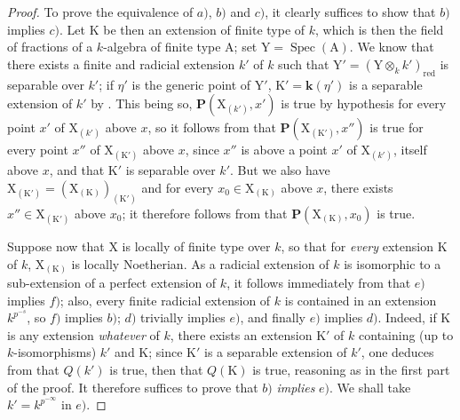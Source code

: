 \begin{proof}
To prove the equivalence of $a)$, $b)$ and $c)$, it clearly suffices to show that $b)$ implies $c)$. Let $\mathrm{K}$ be then an extension of finite type of $k$, which is then the field of fractions of a $k$-algebra of finite type $\mathrm{A}$; set $\mathrm{Y}=\operatorname{Spec}(\mathrm{A})$. We know  that there exists a finite and radicial extension $k'$ of $k$ such that $\mathrm{Y}'=(\mathrm{Y}\otimes_k k')_{\mathrm{red}}$ is separable over $k'$; if $\eta'$ is the generic point of $\mathrm{Y}'$, $\mathrm{K}'=\boldsymbol{k}(\eta')$ is a separable extension of $k'$ by . This being so, $\boldsymbol{P}(\mathrm{X}_{(k')},x')$ is true by hypothesis for every point $x'$ of $\mathrm{X}_{(k')}$ above $x$, so it follows from  that $\boldsymbol{P}(\mathrm{X}_{(\mathrm{K}')},x'')$ is true for every point $x''$ of $\mathrm{X}_{(\mathrm{K}')}$ above $x$, since $x''$ is above a point $x'$ of $\mathrm{X}_{(k')}$, itself above $x$, and that $\mathrm{K}'$ is separable over $k'$. But we also have $\mathrm{X}_{(\mathrm{K}')}=(\mathrm{X}_{(\mathrm{K})})_{(\mathrm{K}')}$ and for every $x_0\in\mathrm{X}_{(\mathrm{K})}$ above $x$, there exists $x''\in\mathrm{X}_{(\mathrm{K}')}$ above $x_0$; it therefore follows from  that $\boldsymbol{P}(\mathrm{X}_{(\mathrm{K})},x_0)$ is true.

Suppose now that $\mathrm{X}$ is locally of finite type over $k$, so that for \emph{every} extension $\mathrm{K}$ of $k$, $\mathrm{X}_{(\mathrm{K})}$ is locally Noetherian. As a radicial extension of $k$ is isomorphic to a sub-extension of a perfect extension of $k$, it follows immediately from  that $e)$ implies $f)$; also, every finite radicial extension of $k$ is contained in an extension $k^{p^{-s}}$, so $f)$ implies $b)$; $d)$ trivially implies $e)$, and finally $e)$ implies $d)$. Indeed, if $\mathrm{K}$ is any extension \emph{whatever} of $k$, there exists an extension $\mathrm{K}'$ of $k$ containing (up to $k$-isomorphisms) $k'$ and $\mathrm{K}$; since $\mathrm{K}'$ is a separable extension of $k'$, one deduces from  that $Q(k')$ is true, then that $Q(\mathrm{K})$ is true, reasoning as in the first part of the proof. It therefore suffices to prove that $b)$ \emph{implies} $e)$. We shall take $k'=k^{p^{-\infty}}$ in $e)$.


\end{proof}
